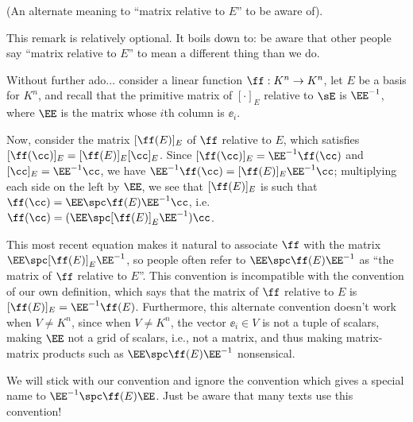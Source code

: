 \begin{remark}
    (An alternate meaning to ``matrix relative to $E$'' to be aware of).

    This remark is relatively optional. It boils down to: be aware that other people say ``matrix relative to $E$'' to mean a different thing than we do.
    
    Without further ado... consider a linear function $\ff:K^n \rightarrow K^n$, let $E$ be a basis for $K^n$, and recall that the primitive matrix of $[\cdot]_E$ relative to $\sE$ is $\EE^{-1}$, where $\EE$ is the matrix whose $i$th column is $\ee_i$.
    
    Now, consider the matrix $[\ff(E)]_E$ of $\ff$ relative to $E$, which satisfies $[\ff(\cc)]_E = [\ff(E)]_E [\cc]_E$. Since ${[\ff(\cc)]_E = \EE^{-1} \ff(\cc)}$ and $[\cc]_E = \EE^{-1} \cc$, we have $\EE^{-1} \ff(\cc) = [\ff(E)]_E \EE^{-1} \cc$; multiplying each side on the left by $\EE$, we see that $[\ff(E)]_E$ is such that $\ff(\cc) = \EE \spc \ff(E) \EE^{-1} \cc$, i.e. $\ff(\cc) = (\EE \spc [\ff(E)]_E \EE^{-1}) \cc$.
    
    This most recent equation makes it natural to associate $\ff$ with the matrix $\EE \spc [\ff(E)]_E \EE^{-1}$, so people often refer to $\EE \spc \ff(E) \EE^{-1}$ as ``the matrix of $\ff$ relative to $E$''. This convention is incompatible with the convention of our own definition, which says that the matrix of $\ff$ relative to $E$ is $[\ff(E)]_E = \EE^{-1} \ff(E)$. Furthermore, this alternate convention doesn't work when $V \neq K^n$, since when $V \neq K^n$, the vector $\ee_i \in V$ is not a tuple of scalars, making $\EE$ not a grid of scalars, i.e., not a matrix, and thus making matrix-matrix products such as $\EE \spc \ff(E) \EE^{-1}$ nonsensical.
    
    We will stick with our convention and ignore the convention which gives a special name to $\EE^{-1} \spc \ff(E) \EE$. Just be aware that many texts use this convention!
\end{remark}

